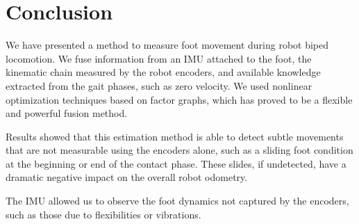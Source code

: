 
\section{Conclusion}

We have presented a method to measure foot movement during robot biped locomotion. We fuse information from an IMU attached to the foot, the kinematic chain measured by the robot encoders, and available knowledge extracted from the gait phases, such as zero velocity. We used nonlinear optimization techniques based on factor graphs, which has proved to be a flexible and powerful fusion method.

Results showed that this estimation method is able to detect subtle movements that are not measurable using the encoders alone, such as a sliding foot condition at the beginning or end of the contact phase. These slides, if undetected, have a dramatic negative impact on the overall robot odometry.

The IMU allowed us to observe the foot dynamics not captured by the encoders, such as those due to flexibilities or vibrations.